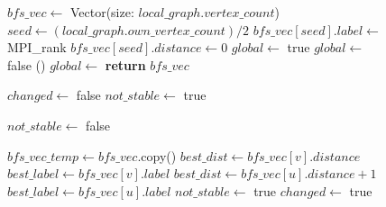 \documentclass[conference]{IEEEtran}
\begin{document}
\begin{figure}  
    \begin{algorithmic}[1]  
    \State $bfs\_vec \gets$ Vector(size: $local\_graph.vertex\_count$)
    \State $seed \gets (local\_graph.own\_vertex\_count) /2$
    \State $bfs\_vec[seed].label \gets $ MPI\_rank
    \State $bfs\_vec[seed].distance \gets 0$
    \State $global \gets $ true
        \State $global \gets $ false
        \State {}()
        \State $global \gets$ 
    \EndWhile
    \State \textbf{return} $bfs\_vec$
    
    \EndProcedure  
    \end{algorithmic}

    \vspace{10pt}

    \begin{algorithmic}[1]  
    



    \vspace{10pt}


    \State $changed \gets $ false
    \State $not\_stable \gets $ true

        \State $not\_stable \gets $ false
        
        \State $bfs\_vec\_temp \gets bfs\_vec$.copy()
        \State $best\_dist \gets bfs\_vec[v].distance$
        \State $best\_label \gets bfs\_vec[v].label$ 
                \State $best\_dist \gets bfs\_vec[u].distance + 1$
                \State $best\_label \gets bfs\_vec[u].label$
                \State $not\_stable \gets $ true
                \State $changed \gets $ true


\end{algorithmic}
\end{figure}
\end{document}
